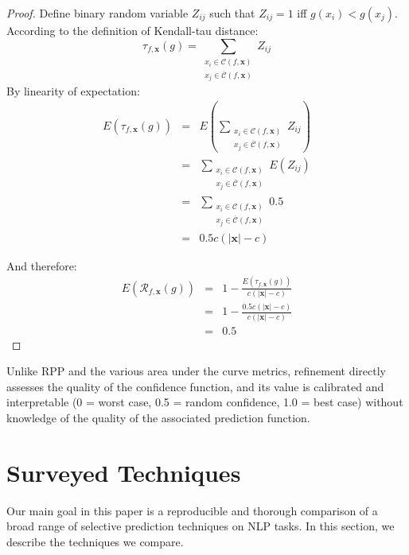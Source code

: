 \documentclass[11pt]{article}
\begin{document}
\begin{proof}
Define binary random variable $Z_{ij}$ such that $Z_{ij}=1$ iff $g(x_i) < g(x_j)$. According to the definition of Kendall-tau distance:
\begin{equation*}
	\tau_{f, \mathbf{x}}(g) = \sum_{\substack{
x_i \in \mathcal{C}(f, \mathbf{x})\\
x_j \in \overline{\mathcal{C}}(f, \mathbf{x})}} Z_{ij}
\end{equation*}
By linearity of expectation:
\begin{eqnarray*}
	E(\tau_{f, \mathbf{x}}(g)) &=& E\left(\sum_{\substack{
x_i \in \mathcal{C}(f, \mathbf{x})\\
x_j \in \overline{\mathcal{C}}(f, \mathbf{x})}} Z_{ij}\right)\\
&=& \sum_{\substack{
x_i \in \mathcal{C}(f, \mathbf{x})\\
x_j \in \overline{\mathcal{C}}(f, \mathbf{x})}} E( Z_{ij} )\\
&=& \sum_{\substack{
x_i \in \mathcal{C}(f, \mathbf{x})\\
x_j \in \overline{\mathcal{C}}(f, \mathbf{x})}} 0.5\\
&=& 0.5 c(|\mathbf{x}|-c)
\end{eqnarray*}

\noindent And therefore:
\begin{eqnarray*}
	E(\mathcal{R}_{f, \mathbf{x}}(g)) &=& 
	1 - \frac{E(\tau_{f, \mathbf{x}}(g))}{c(|\mathbf{x}|-c)}\\
	&=& 1 - \frac{0.5 c(|\mathbf{x}|-c)}{c(|\mathbf{x}|-c)}\\
	&=& 0.5	
\end{eqnarray*}

\end{proof}



\noindent Unlike RPP and the various area under the curve metrics, refinement directly assesses the quality of the confidence function, and its value is calibrated and interpretable (0 = worst case, 0.5 = random confidence, 1.0 = best case) without knowledge of the quality of the associated prediction function.

\section{Surveyed Techniques}

Our main goal in this paper is a reproducible and thorough comparison of a broad range of selective prediction techniques on NLP tasks. In this section, we describe the techniques we compare. 
\end{document}
